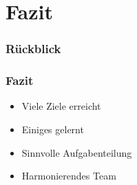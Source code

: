\section{Fazit}

\begin{frame}
	\frametitle{Rückblick}
	
\end{frame}

\begin{frame}
\frametitle{Fazit}

\begin{itemize}
	\item Viele Ziele erreicht
	\item Einiges gelernt
	\item Sinnvolle Aufgabenteilung
	\item Harmonierendes Team
\end{itemize}
\end{frame}   